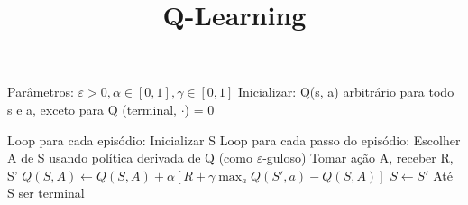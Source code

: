 \documentclass[brazilian,preview]{standalone}
\title{Q-Learning}
\begin{document}
\begin{algorithm}
Parâmetros: $\varepsilon > 0, \alpha \in  [0, 1], \gamma \in  [0, 1] $
Inicializar:
    Q(s, a) arbitrário para todo s e a, exceto para Q (terminal, $\cdot$) = 0

Loop para cada episódio:
    Inicializar S
    Loop para cada passo do episódio:
        Escolher A de S usando política derivada de Q (como $\varepsilon$-guloso)
        Tomar ação A, receber R, S'
        $Q(S, A) \leftarrow Q(S, A) + \alpha [R + \gamma \max_{a}Q(S', a) - Q(S, A)]$
        $S \leftarrow S'$
    Até S ser terminal
\end{algorithm}
\end{document}
